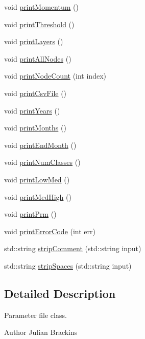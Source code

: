 \begin{DoxyCompactItemize}
\item 
void \hyperlink{classPrm_a26e6ad5f9b4d59aecae168a8c94f0866}{print\-Momentum} ()
\item 
void \hyperlink{classPrm_aab8f1acaec1480e79ee2abdf41197785}{print\-Threshold} ()
\item 
void \hyperlink{classPrm_a5f187d1ca951065867a2ea3999bfd1ec}{print\-Layers} ()
\item 
void \hyperlink{classPrm_a320c6a41ea4415a979ce18c89ea3a330}{print\-All\-Nodes} ()
\item 
void \hyperlink{classPrm_a7b12b30a4ae137fe035e91681b79c61c}{print\-Node\-Count} (int index)
\item 
void \hyperlink{classPrm_a7fb18166e0c062d2e243d13c966e197e}{print\-Csv\-File} ()
\item 
void \hyperlink{classPrm_a30917a16a42f1550eaea3dcff45f1ac4}{print\-Years} ()
\item 
void \hyperlink{classPrm_a9c2a7e5aac8359d54f6e191e098c54e3}{print\-Months} ()
\item 
void \hyperlink{classPrm_a261c76671548abf05c190ccc01d4721e}{print\-End\-Month} ()
\item 
void \hyperlink{classPrm_a87c9f9ab6dde1e7a91993bda4dbb36d5}{print\-Num\-Classes} ()
\item 
void \hyperlink{classPrm_a66ac4009f629c6c11989b107e06f64b8}{print\-Low\-Med} ()
\item 
void \hyperlink{classPrm_ac62b14bce152ea1837c006b53d393c90}{print\-Med\-High} ()
\item 
void \hyperlink{classPrm_a37e160a85bf7f3b225321958d3687503}{print\-Prm} ()
\item 
void \hyperlink{classPrm_a5b8d160d8ab212f09ea9070a313cca6d}{print\-Error\-Code} (int err)
\item 
std\-::string \hyperlink{classPrm_a9a8b6a6dd547159f794499a798e2305e}{strip\-Comment} (std\-::string input)
\item 
std\-::string \hyperlink{classPrm_afc4f884eefec9b35378f31fbc4ffdda4}{strip\-Spaces} (std\-::string input)
\end{DoxyCompactItemize}


\subsection{Detailed Description}
Parameter file class. 

\begin{DoxyAuthor}{Author}
Julian Brackins 
\end{DoxyAuthor}


